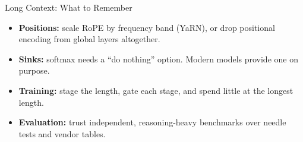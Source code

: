 \begin{frame}{Long Context: What to Remember}
    \begin{itemize}\itemsep0.6em
        \item \textbf{Positions:} scale RoPE by frequency band (YaRN), or drop positional encoding from global layers altogether.
        \item \textbf{Sinks:} softmax needs a ``do nothing'' option. Modern models provide one on purpose.
        \item \textbf{Training:} stage the length, gate each stage, and spend little at the longest length.
        \item \textbf{Evaluation:} trust independent, reasoning-heavy benchmarks over needle tests and vendor tables.
    \end{itemize}
    \vspace{0.4em}
\end{frame}
